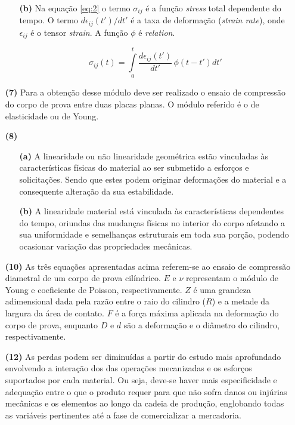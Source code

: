 \documentclass[a4paper, 12pt]{article}
\begin{document}
\begin{itemize}
\begin{itemize}
			
			\item[\textbf{(b)}] Na equação \eqref{eq:2} o termo $\sigma_{ij}$ é a função \textit{stress} total dependente do tempo. O termo $d\epsilon_{ij}(t')/dt'$ é a taxa de deformação (\textit{strain rate}), onde $\epsilon_{ij}$ é o tensor \textit{strain}. A função $\phi$ é \textit{relation}.
			
			\begin{equation}
				\label{eq:2}
				\sigma_{ij}(t)=\int\limits_{0}^{t}\dfrac{d\epsilon_{ij}(t')}{dt'}\,\phi(t-t')dt'
			\end{equation}
		\end{itemize}
		
		\item[\textbf{(7)}] Para a obtenção desse módulo deve ser realizado o ensaio de compressão do corpo de prova entre duas placas planas. O módulo referido é o de elasticidade ou de Young.
	
		\item[\textbf{(8)}]		
		
		\begin{itemize}
			\item[\textbf{(a)}] A linearidade ou não linearidade geométrica estão vinculadas às características físicas do material ao ser submetido a esforços e solicitações. Sendo que estes podem originar deformações do material e a consequente alteração da sua estabilidade.
			\item[\textbf{(b)}] A linearidade material está vinculada às características dependentes do tempo, oriundas das mudanças físicas no interior do corpo afetando a sua uniformidade e semelhanças estruturais em toda sua porção, podendo ocasionar variação das propriedades mecânicas.
		\end{itemize}
	
		\item[\textbf{(10)}] As três equações apresentadas acima referem-se ao ensaio de compressão diametral de um corpo de prova cilíndrico. $E$ e $\nu$ representam o módulo de Young e coeficiente de Poisson, respectivamente. $Z$ é uma grandeza adimensional dada pela razão entre o raio do cilindro ($R$) e a metade da largura da área de contato. $F$ é a força máxima aplicada na deformação do corpo de prova, enquanto $D$ e $d$ são a deformação e o diâmetro do cilindro, respectivamente.
		
		\item[\textbf{(12)}] As perdas podem ser diminuídas a partir do estudo mais aprofundado envolvendo a interação dos das operações mecanizadas e os esforços suportados por cada material. Ou seja, deve-se haver mais especificidade e adequação entre o que o produto requer para que não sofra danos ou injúrias mecânicas e os elementos ao longo da cadeia de produção, englobando todas as variáveis pertinentes até a fase de comercializar a mercadoria.
	\end{itemize} 
\end{document}

